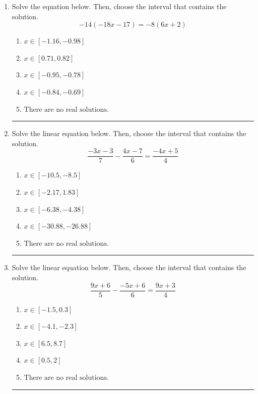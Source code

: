 \documentclass[14pt]{extbook}
\newcommand{\litem}[1]{\item#1\hspace*{-1cm}\rule{\textwidth}{0.4pt}}
\begin{document}
\begin{enumerate}
{\begin{enumerate}[label=\Alph*.]
\end{enumerate} }
\litem{
Solve the equation below. Then, choose the interval that contains the solution.\[ -14(-18x -17) = -8(6x + 2) \]\begin{enumerate}[label=\Alph*.]
\item \( x \in [-1.16, -0.98] \)
\item \( x \in [0.71, 0.82] \)
\item \( x \in [-0.95, -0.78] \)
\item \( x \in [-0.84, -0.69] \)
\item \( \text{There are no real solutions.} \)

\end{enumerate} }
\litem{
Solve the linear equation below. Then, choose the interval that contains the solution.\[ \frac{-3x -3}{7} - \frac{4x -7}{6} = \frac{-4x + 5}{4} \]\begin{enumerate}[label=\Alph*.]
\item \( x \in [-10.5, -8.5] \)
\item \( x \in [-2.17, 1.83] \)
\item \( x \in [-6.38, -4.38] \)
\item \( x \in [-30.88, -26.88] \)
\item \( \text{There are no real solutions.} \)

\end{enumerate} }
\litem{
Solve the linear equation below. Then, choose the interval that contains the solution.\[ \frac{9x + 6}{5} - \frac{-5x + 6}{6} = \frac{9x + 3}{4} \]\begin{enumerate}[label=\Alph*.]
\item \( x \in [-1.5, 0.3] \)
\item \( x \in [-4.1, -2.3] \)
\item \( x \in [6.5, 8.7] \)
\item \( x \in [0.5, 2] \)
\item \( \text{There are no real solutions.} \)


\end{enumerate}}
\end{enumerate}
\end{document}
